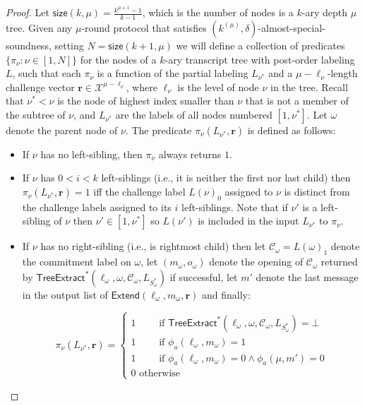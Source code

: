 \documentclass{article}
\theoremstyle{definition}
\begin{document}
\begin{proof}
Let $\textsf{size}(k, \mu) = \frac{k^{\mu+1}-1}{k-1}$, which is the number of nodes is a $k$-ary depth $\mu$ tree. Given any $\mu$-round protocol that satisfies $(k^{(\mu)}, \delta)$-almost-special-soundness, setting $N = \textsf{size}(k+1, \mu)$ we will define a collection of predicates $\{\pi_\nu: \nu \in [1,N]\}$ for the nodes of a $k$-ary transcript tree with post-order labeling $L$, such that each $\pi_\nu$ is a function of the partial labeling $L_{\nu^*}$ and a $\mu - \ell_\nu$-length challenge vector $\mathbf{r} \in \mathcal{X}^{\mu - \ell_\nu}$, where $\ell_\nu$ is the level of node $\nu$ in the tree. Recall that $\nu^* < \nu$ is the node of highest index smaller than $\nu$ that is not a member of the subtree of $\nu$, and $L_{\nu^*}$ are the labels of all nodes numbered $[1, \nu^*]$. Let $\omega$ denote the parent node of $\nu$. The predicate $\pi_\nu(L_{\nu^*}, \mathbf{r})$ is defined as follows: 
\begin{itemize} 
\item If $\nu$ has no left-sibling, then $\pi_\nu$ always returns $1$. 
\item If $\nu$ has $0 < i < k$ left-siblings (i.e., it is neither the first nor last child) then $\pi_\nu(L_{\nu^*}, \mathbf{r}) = 1$ iff the challenge label $L(\nu)_0$ assigned to $\nu$ is distinct from the challenge labels assigned to its $i$ left-siblings. Note that if $\nu'$ is a left-sibling of $\nu$ then $\nu' \in [1, \nu^*]$ so $L(\nu')$ is included in the input $L_{\nu^*}$ to $\pi_\nu$. 
\item If $\nu$ has no right-sibling (i.e., is rightmost child) then let $\mathcal{C}_\omega = L(\omega)_1$ denote the commitment label on $\omega$, let $(m_\omega, o_\omega)$ denote the opening of $\mathcal{C}_\omega$ returned by $\textsf{TreeExtract}^*(\ell_\omega, \omega, \mathcal{C}_\omega, L_{S^*_\omega})$ if successful, let $m'$ denote the last message in the output list of $\textsf{Extend}(\ell_\omega, m_\omega,\mathbf{r})$ and finally: 

 $$\pi_\nu(L_{\nu^*}, \mathbf{r}) = 
 \begin{cases} 1 \quad\quad \text{ if }  \textsf{TreeExtract}^*(\ell_\omega, \omega, \mathcal{C}_\omega, L_{S^*_\omega}) = \bot \\ 
 1 \quad \quad \text{ if } \phi_a(\ell_\omega, m_\omega) = 1\\
 1 \quad \quad \text{ if } \phi_a(\ell_\omega, m_\omega) = 0 \wedge \phi_a(\mu, m') = 0 \\ 
0\text{ otherwise} 
\end{cases} $$ 



\end{itemize}
\end{proof}
\end{document}
